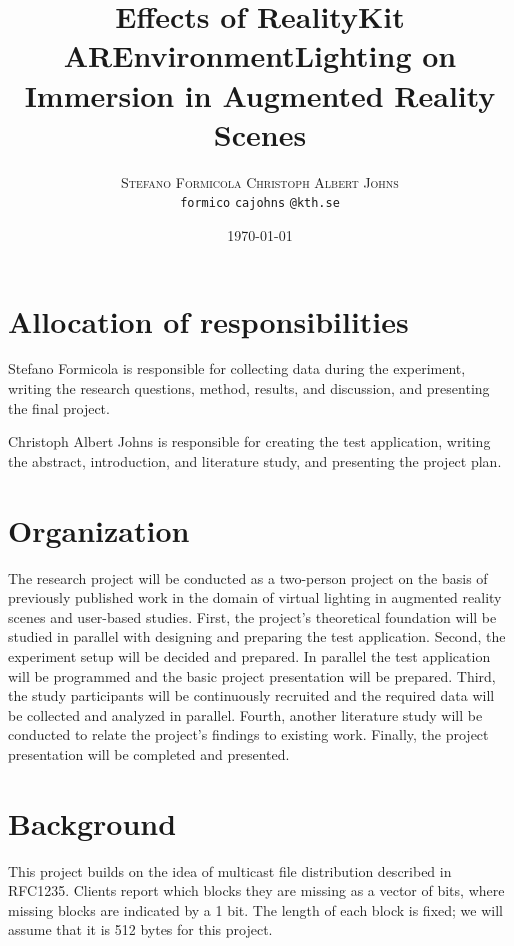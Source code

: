 \documentclass[12pt,twoside,english]{article}
\title{Effects of RealityKit AREnvironmentLighting on Immersion in Augmented Reality Scenes}
\author{
        \textsc{Stefano Formicola}
            \qquad
        \textsc{Christoph Albert Johns}
        \mbox{}\\
        \normalsize
            \texttt{formico}
        \textbar{}
            \texttt{cajohns}
        \normalsize
            \texttt{@kth.se}
}
\date{\today}
\begin{document}
\maketitle






\section{Allocation of responsibilities}
\label{sect:alloc_responsibilities}

Stefano Formicola is responsible for collecting data during the experiment, writing the research questions, method, results, and discussion, and presenting the final project.

Christoph Albert Johns is responsible for creating the test application, writing the abstract, introduction, and literature study, and presenting the project plan.


\section{Organization}
\label{sect:organization}

The research project will be conducted as a two-person project on the basis of previously published work in the domain of virtual lighting in augmented reality scenes and user-based studies.
First, the project's theoretical foundation will be studied in parallel with designing and preparing the test application.
Second, the experiment setup will be decided and prepared. In parallel the test application will be programmed and the basic project presentation will be prepared.
Third, the study participants will be continuously recruited and the required data will be collected and analyzed in parallel.
Fourth, another literature study will be conducted to relate the project's findings to existing work.
Finally, the project presentation will be completed and presented.


\section{Background}
\label{sect:background}
This project builds on the idea of multicast file distribution described in RFC1235\cite{john_ioannidis_coherent_1991}. Clients report which blocks they are missing as a vector of bits, where missing blocks are indicated by a 1 bit. The length of each block is fixed; we will assume that it is 512 bytes for this project.
\end{document}
